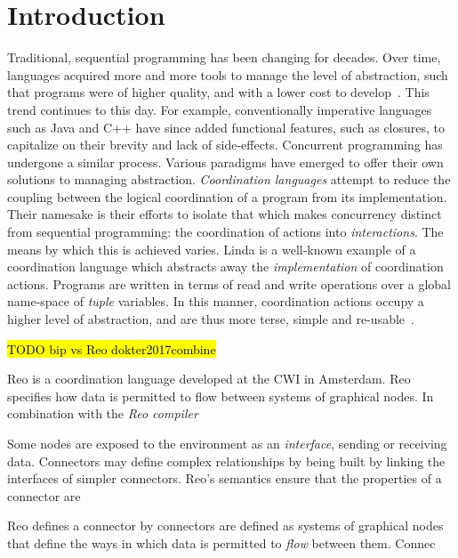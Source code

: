 \chapter{Introduction}	


Traditional, sequential programming has been changing for decades. Over time, languages acquired more and more tools to manage the level of abstraction, such that programs were of higher quality, and with a lower cost to develop~\cite{shaw1984abstraction}. This trend continues to this day. For example, conventionally imperative languages such as Java and C++ have since added functional features, such as closures, to capitalize on their brevity and lack of side-effects. Concurrent programming has undergone a similar process. Various paradigms have emerged to offer their own solutions to managing abstraction. \textit{Coordination languages} attempt to reduce the coupling between the logical coordination of a program from its implementation. Their namesake is their efforts to isolate that which makes concurrency distinct from sequential programming: the coordination of actions into \textit{interactions}. The means by which this is achieved varies. Linda is a well-known example of a coordination language which abstracts away the \textit{implementation} of coordination actions. Programs are written in terms of read and write operations over a global name-space of \textit{tuple} variables. In this manner, coordination actions occupy a higher level of abstraction, and are thus more terse, simple and re-usable~\cite{gelernter1985generative}.

\hl{TODO bip vs Reo dokter2017combine}

Reo is a coordination language developed at the CWI in Amsterdam. Reo specifies how data is permitted to flow between systems of graphical nodes. In combination with the \textit{Reo compiler}


Some nodes are exposed to the environment as an \textit{interface}, sending or receiving data. Connectors may define complex relationships by being built by linking the interfaces of simpler connectors. Reo's semantics ensure that the properties of a connector are 

Reo defines a connector by connectors are defined as systems of graphical nodes that define the ways in which data is permitted to \textit{flow} between them. Connec




